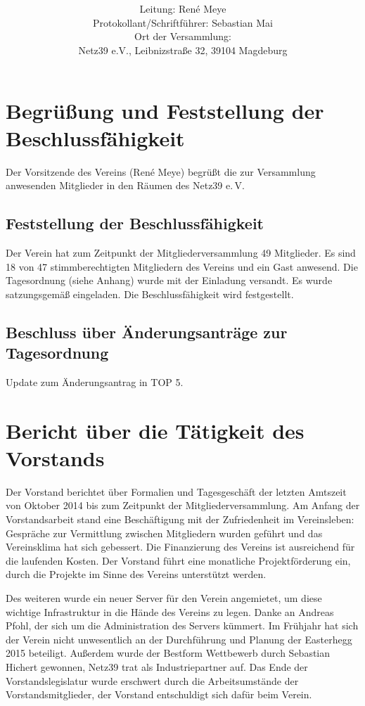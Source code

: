 \documentclass[a4paper,12pt,titlepage]{scrartcl}
\title{ \logo \\ \vspace{0.2\baselineskip} \thetitle}
\author{
Leitung: René Meye\\
Protokollant/Schriftführer: Sebastian Mai \\
Ort der Versammlung:\\ Netz39 e.V., Leibnizstraße 32, 39104 Magdeburg \\
}
\date{\displaydate{date}} %
\begin{document}
\maketitle
\tableofcontents

\clearpage

\section{Begrüßung und Feststellung der Beschlussfähigkeit}
Der Vorsitzende des Vereins (René Meye) begrüßt die zur Versammlung anwesenden Mitglieder in den Räumen des Netz39 e.\,V.

\subsection{Feststellung der Beschlussfähigkeit}
Der Verein hat zum Zeitpunkt der Mitgliederversammlung 49 Mitglieder. Es sind 18 von 47 stimmberechtigten Mitgliedern des Vereins und ein Gast anwesend. Die Tagesordnung (siehe Anhang) wurde mit der Einladung versandt. Es wurde satzungsgemäß eingeladen. Die Beschlussfähigkeit wird festgestellt.

\subsection{Beschluss über Änderungsanträge zur Tagesordnung}
Update zum Änderungsantrag in TOP 5.

\section{Bericht über die Tätigkeit des Vorstands}
Der Vorstand berichtet über Formalien und Tagesgeschäft der letzten Amtszeit von Oktober 2014 bis zum Zeitpunkt der Mitgliederversammlung.
Am Anfang der Vorstandsarbeit stand eine Beschäftigung mit der Zufriedenheit im Vereinsleben: Gespräche zur Vermittlung zwischen Mitgliedern wurden geführt und das Vereinsklima hat sich gebessert.
Die Finanzierung des Vereins ist ausreichend für die laufenden Kosten. Der Vorstand führt eine monatliche Projektförderung ein, durch die Projekte im Sinne des Vereins unterstützt werden.

Des weiteren wurde ein neuer Server für den Verein angemietet, um diese wichtige Infrastruktur in die Hände des Vereins zu legen. Danke an Andreas Pfohl, der sich um die Administration des Servers kümmert.
Im Frühjahr hat sich der Verein nicht unwesentlich an der Durchführung und Planung der Easterhegg 2015 beteiligt. Außerdem wurde der Bestform Wettbewerb durch Sebastian Hichert gewonnen, Netz39 trat als Industriepartner auf.
Das Ende der Vorstandslegislatur wurde erschwert durch die Arbeitsumstände der Vorstandsmitglieder, der Vorstand entschuldigt sich dafür beim Verein.
\end{document}
